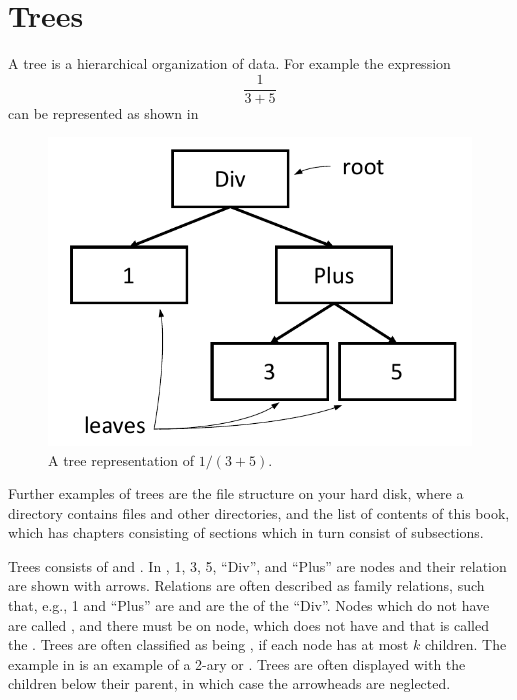 \documentclass[fsharpNotes.tex]{subfiles}
\begin{document}
\section{Trees}
A tree is a hierarchical organization of data. For example the expression
\begin{equation}
\frac{1}{3+5}
\end{equation}
can be represented as shown in 
\begin{figure}
  \centering
  \includegraphics[width=0.45\linewidth]{tree}
  \caption{A tree representation of $1/(3+5)$.}
  \label{fig:tree}
\end{figure}
Further examples of trees are the file structure on your hard disk, where a directory contains files and other directories, and the list of contents of this book, which has chapters consisting of sections which in turn consist of subsections.

Trees consists of  and . In , 1, 3, 5, ``Div'', and ``Plus'' are nodes and their relation are shown with arrows. Relations are often described as family relations, such that, e.g., 1 and ``Plus'' are  and are the  of the  ``Div''. Nodes which do not have  are called , and there must be on node, which does not have  and that is called the . Trees are often classified as being , if each node has at most  $k$ children. The example in  is an example of a 2-ary or . Trees are often displayed with the children below their parent, in which case the arrowheads are neglected. 
\end{document}
